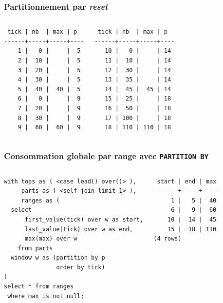\documentclass{beamer}
\begin{document}
\begin{frame}[fragile]
  \frametitle{Partitionnement par \textit{reset}}

\begin{columns}
\begin{verbatim}
 tick | nb  | max | p  
------+-----+-----+----
    1 |   0 |     |  5
    2 |  10 |     |  5
    3 |  20 |     |  5
    4 |  30 |     |  5
    5 |  40 |  40 |  5
    6 |   0 |     |  9
    7 |  20 |     |  9
    8 |  30 |     |  9
    9 |  60 |  60 |  9
\end{verbatim}

\begin{verbatim}
 tick | nb  | max | p  
------+-----+-----+----
   10 |   0 |     | 14
   11 |  10 |     | 14
   12 |  30 |     | 14
   13 |  35 |     | 14
   14 |  45 |  45 | 14
   15 |  25 |     | 18
   16 |  50 |     | 18
   17 | 100 |     | 18
   18 | 110 | 110 | 18
\end{verbatim}
\end{columns}
\end{frame}

\begin{frame}[fragile]
  \frametitle{Consommation globale par range avec \texttt{PARTITION BY}}

\begin{columns}
\begin{verbatim}
with tops as ( <case lead() over()> ),
     parts as ( <self join limit 1> ),
     ranges as (
  select
      first_value(tick) over w as start,
      last_value(tick) over w as end,
      max(max) over w
    from parts
  window w as (partition by p
               order by tick)
)
select * from ranges
 where max is not null;
\end{verbatim}

\begin{verbatim}
 start | end | max 
-------+-----+-----
     1 |   5 |  40
     6 |   9 |  60
    10 |  14 |  45
    15 |  18 | 110
(4 rows)
\end{verbatim}
\end{columns}
\end{frame}
\end{document}
